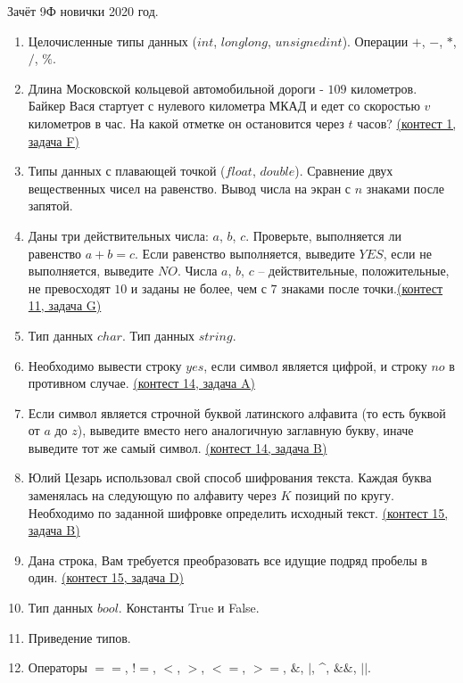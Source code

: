 \documentclass[a4paper,12pt]{article}
\begin{document}
Зачёт 9Ф новички 2020 год.
\begin{enumerate}
\item Целочисленные типы данных ($int$, $long long$, $unsigned int$). Операции $+$, $-$, $*$, $/$, $\%$.
\item Длина Московской кольцевой автомобильной дороги - $109$ километров. Байкер Вася стартует с нулевого километра МКАД и едет со скоростью $v$ километров в час. На какой отметке он остановится через $t$ часов? \href{https://informatics.msk.ru/mod/statements/view3.php?chapterid=2940}{(контест 1, задача F)} 
\item Типы данных с плавающей точкой ($float$, $double$). Сравнение двух вещественных чисел на равенство. Вывод числа на экран с $n$ знаками после запятой.
\item Даны три действительных числа: $a$, $b$, $c$. Проверьте, выполняется ли равенство $a + b = c$. Если равенство выполняется, выведите $YES$, если не выполняется, выведите $NO$. Числа $a$, $b$, $c$ –  действительные, положительные, не превосходят $10$ и заданы не более, чем с $7$ знаками после точки.\href{https://informatics.msk.ru/mod/statements/view3.php?chapterid=74}{(контест 11, задача G)}
\item Тип данных $char$. Тип данных $string$.
\item Необходимо вывести  строку $yes$, если символ является цифрой, и строку $no$ в противном случае. \href{https://informatics.msk.ru/mod/statements/view3.php?chapterid=102}{(контест 14, задача A)}
\item Если символ является строчной буквой латинского алфавита (то есть буквой от $a$ до $z$), выведите вместо него аналогичную заглавную букву, иначе выведите тот же самый символ. \href{https://informatics.msk.ru/mod/statements/view3.php?chapterid=103}{(контест 14, задача B)}
\item Юлий Цезарь использовал свой способ шифрования текста. Каждая буква заменялась на следующую по алфавиту через $K$ позиций по кругу. Необходимо по заданной шифровке определить исходный текст. \href{https://informatics.msk.ru/mod/statements/view3.php?chapterid=1415}{(контест 15, задача B)}
\item Дана строка, Вам требуется преобразовать все идущие подряд пробелы в один. \href{https://informatics.msk.ru/mod/statements/view3.php?chapterid=1421}{(контест 15, задача D)}
\item Тип данных $bool$. Константы True и False.
\item Приведение типов.
\item Операторы $==$, $!=$, $<$, $>$, $<=$, $>=$, $\&$, $|$, \textasciicircum, $\&\&$, $||$.

\end{enumerate}
\end{document}
